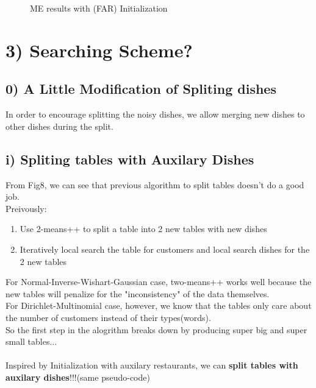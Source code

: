 \documentclass{article}
\begin{document}
\begin{spacing}{1.1}
\begin{figure}[h]
    \caption{ME results with (FAR) Initialization}
    \label{fig:by:table} 
\end{figure}





\section{}
\section{}
\section{}







\section{3) Searching Scheme?}

\subsection{0) A Little Modification of Spliting dishes}
In order to encourage splitting the noisy dishes, we allow merging new dishes to other dishes during the split.
\subsection{i) Spliting tables with Auxilary Dishes}
From Fig8, we can see that previous algorithm to split tables doesn't do a good job.\\
Preivously:
\begin{enumerate}
\item Use 2-means++ to split a table into 2 new tables with new dishes 
\item Iteratively local search the table for customers and local search dishes for the 2 new tables
\end{enumerate}
For Normal-Inverse-Wishart-Gaussian case, two-means++ works well because the new tables will penalize for the "inconsistency" of the data themselves.\\
For Dirichlet-Multinomial case, however, we know that the tables only care about the number of customers instead of their types(words).\\
So the first step in the alogrithm breaks down by producing super big and super small tables...\\ \\
Inspired by Initialization with auxilary restaurants, we can {\bf split tables with auxilary dishes}!!!(same pseudo-code)\\


\end{spacing}
\end{document}
